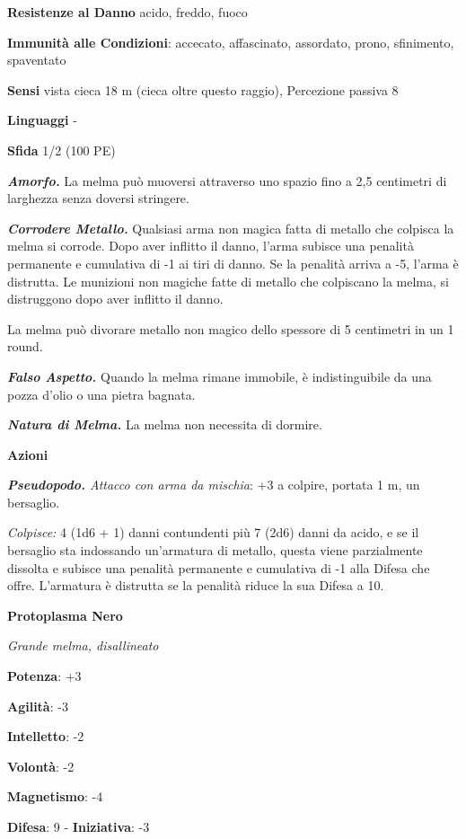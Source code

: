 \begin{multicols}{2}
\textbf{Resistenze al Danno} acido, freddo, fuoco

\textbf{Immunità alle Condizioni}: accecato, affascinato, assordato,
prono, sfinimento, spaventato

\textbf{Sensi} vista cieca 18 m (cieca oltre questo raggio), Percezione
passiva 8

\textbf{Linguaggi} -

\textbf{Sfida} 1/2 (100 PE)\smallskip

\emph{\textbf{Amorfo.}} La melma può muoversi attraverso uno spazio fino
a 2,5 centimetri di larghezza senza doversi stringere.

\emph{\textbf{Corrodere Metallo.}} Qualsiasi arma non magica fatta di
metallo che colpisca la melma si corrode. Dopo aver inflitto il danno,
l'arma subisce una penalità permanente e cumulativa di -1 ai tiri di
danno. Se la penalità arriva a -5, l'arma è distrutta. Le munizioni non
magiche fatte di metallo che colpiscano la melma, si distruggono dopo
aver inflitto il danno.

La melma può divorare metallo non magico dello spessore di 5 centimetri
in un 1 round.

\emph{\textbf{Falso Aspetto.}} Quando la melma rimane immobile, è
indistinguibile da una pozza d'olio o una pietra bagnata.

\emph{\textbf{Natura di Melma.}} La melma non necessita di dormire.

\smallskip\textbf{Azioni}

\emph{\textbf{Pseudopodo.} Attacco con arma da mischia}: +3 a colpire,
portata 1 m, un bersaglio.

\emph{Colpisce:} 4 (1d6 + 1) danni contundenti più 7 (2d6) danni da
acido, e se il bersaglio sta indossando un'armatura di metallo, questa
viene parzialmente dissolta e subisce una penalità permanente e
cumulativa di -1 alla Difesa che offre. L'armatura è distrutta se la
penalità riduce la sua Difesa a 10.



\textbf{Protoplasma Nero}

\emph{Grande melma, disallineato}

\textbf{Potenza}: +3

\textbf{Agilità}: -3

\textbf{Intelletto}: -2

\textbf{Volontà}: -2

\textbf{Magnetismo}: -4

\textbf{Difesa}: 9 - \textbf{Iniziativa}: -3


\end{multicols}

